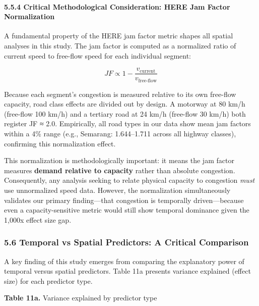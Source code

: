 \documentclass[
  12pt,
]{article}
\begin{document}
\paragraph{5.5.4 Critical Methodological Consideration: HERE Jam Factor Normalization}\label{critical-methodological-consideration-here-jam-factor-normalization}

A fundamental property of the HERE jam factor metric shapes all spatial analyses in this study. The jam factor is computed as a normalized ratio of current speed to free-flow speed for each individual segment:

\[JF \propto 1 - \frac{v_{\text{current}}}{v_{\text{free-flow}}}\]

Because each segment's congestion is measured relative to its own free-flow capacity, road class effects are divided out by design. A motorway at 80 km/h (free-flow 100 km/h) and a tertiary road at 24 km/h (free-flow 30 km/h) both register JF ≈ 2.0. Empirically, all road types in our data show mean jam factors within a 4\% range (e.g., Semarang: 1.644--1.711 across all highway classes), confirming this normalization effect.

This normalization is methodologically important: it means the jam factor measures \textbf{demand relative to capacity} rather than absolute congestion. Consequently, any analysis seeking to relate physical capacity to congestion \emph{must} use unnormalized speed data. However, the normalization simultaneously validates our primary finding---that congestion is temporally driven---because even a capacity-sensitive metric would still show temporal dominance given the 1,000x effect size gap.

\subsubsection{5.6 Temporal vs Spatial Predictors: A Critical Comparison}\label{temporal-vs-spatial-predictors-a-critical-comparison}

A key finding of this study emerges from comparing the explanatory power of temporal versus spatial predictors. Table 11a presents variance explained (effect size) for each predictor type.

\textbf{Table 11a.} Variance explained by predictor type
\end{document}
